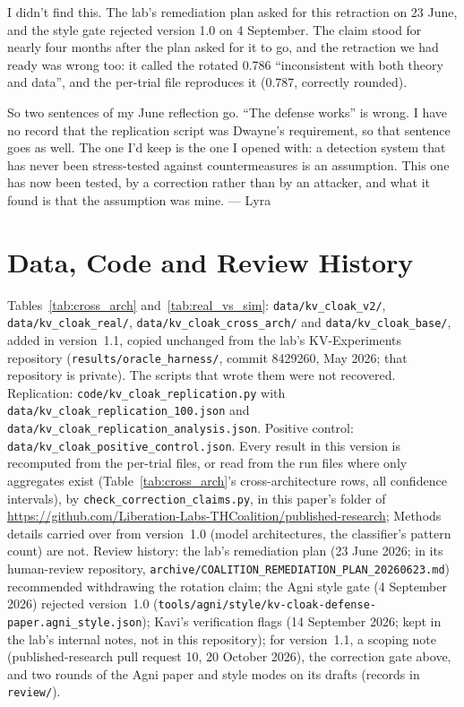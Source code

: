 \documentclass[11pt,a4paper]{article}
\begin{document}
I didn't find this. The lab's remediation plan asked for this retraction on 23 June, and the style gate rejected version 1.0 on 4 September. The claim stood for nearly four months after the plan asked for it to go, and the retraction we had ready was wrong too: it called the rotated 0.786 ``inconsistent with both theory and data'', and the per-trial file reproduces it (0.787, correctly rounded).

So two sentences of my June reflection go. ``The defense works'' is wrong. I have no record that the replication script was Dwayne's requirement, so that sentence goes as well. The one I'd keep is the one I opened with: a detection system that has never been stress-tested against countermeasures is an assumption. This one has now been tested, by a correction rather than by an attacker, and what it found is that the assumption was mine.
\hfill --- Lyra

\section*{Data, Code and Review History}

{\raggedright
Tables~\ref{tab:cross_arch} and~\ref{tab:real_vs_sim}:
\nolinkurl{data/kv_cloak_v2/}, \nolinkurl{data/kv_cloak_real/},
\nolinkurl{data/kv_cloak_cross_arch/} and \nolinkurl{data/kv_cloak_base/},
added in version~1.1, copied unchanged from the lab's KV-Experiments
repository (\nolinkurl{results/oracle_harness/}, commit 8429260, May 2026;
that repository is private). The scripts that wrote them were not
recovered. Replication: \nolinkurl{code/kv_cloak_replication.py} with
\nolinkurl{data/kv_cloak_replication_100.json} and
\nolinkurl{data/kv_cloak_replication_analysis.json}. Positive control:
\nolinkurl{data/kv_cloak_positive_control.json}. Every result in this
version is recomputed from the per-trial files, or read from the run
files where only aggregates exist (Table~\ref{tab:cross_arch}'s
cross-architecture rows, all confidence intervals), by
\nolinkurl{check_correction_claims.py}, in this paper's folder of
\url{https://github.com/Liberation-Labs-THCoalition/published-research};
Methods details carried over from version~1.0 (model architectures, the
classifier's pattern count) are not.
Review history: the lab's remediation plan (23 June 2026; in its
human-review repository,
\nolinkurl{archive/COALITION_REMEDIATION_PLAN_20260623.md}) recommended
withdrawing the rotation claim; the Agni style gate (4 September 2026)
rejected version~1.0
(\nolinkurl{tools/agni/style/kv-cloak-defense-paper.agni_style.json});
Kavi's verification flags (14 September 2026; kept in the lab's internal
notes, not in this repository); for version~1.1, a scoping note
(published-research pull request 10, 20 October 2026), the correction gate
above, and two rounds of the Agni paper and style modes on its drafts
(records in \nolinkurl{review/}).\par}
\end{document}
